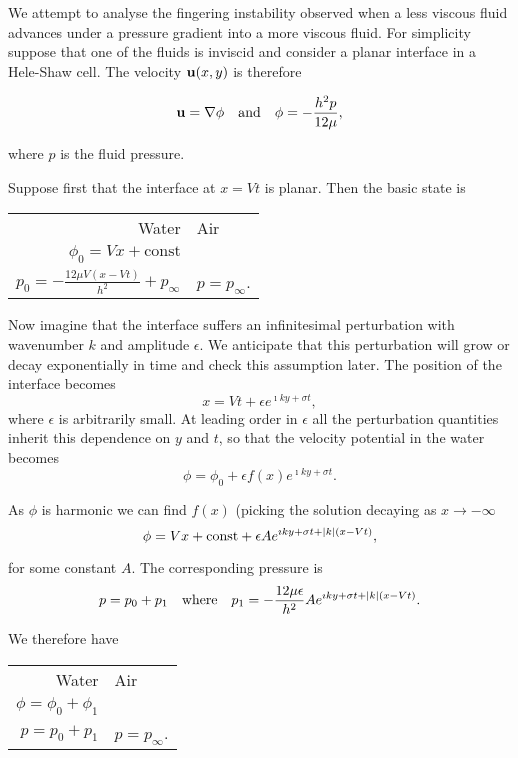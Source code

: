 \documentclass{notes}
\theoremstyle{plain}
\begin{document}
We attempt to analyse the fingering instability observed when a less viscous
fluid advances under a pressure gradient into a more viscous fluid.
For simplicity suppose that one of the fluids is inviscid and consider
a planar interface in a Hele-Shaw cell.  The velocity $\mathbf{u}(x,y)$ is therefore

\[
\mathbf{u} = \nabla \phi \quad \text{and} \quad \phi = - \frac{h^2 p}{12 \mu},
\]

where $p$ is the fluid pressure.

Suppose first that the interface at $x = V t$ is planar.  Then the basic
state is

\begin{center}
\begin{tabular}{r l}
Water & Air \\
$\phi_0 = V x + \text{const}$ &  \\
$p_0 = -\tfrac{12 \mu V (x - Vt)}{h^2} + p_\infty$ & $p = p_\infty$.
\end{tabular}
\end{center}

Now imagine that the interface suffers an infinitesimal perturbation
with wavenumber $k$ and amplitude $\epsilon$.  We anticipate that
this perturbation will grow or decay exponentially in time and check
this assumption later.  The position of the interface becomes
\[
x = V t + \epsilon e^{\imath k y + \sigma t},
\]
where $\epsilon$ is arbitrarily small.  At leading order in $\epsilon$
all the perturbation quantities inherit this dependence on $y$
and $t$, so that the velocity potential in the water becomes
\[
\phi = \phi_0 + \epsilon f(x) e^{\imath k y + \sigma t}.
\]

As $\phi$ is harmonic we can find $f(x)$ (picking the solution decaying
as $x \to - \infty$
\[
\phi = V x + \text{const} + \epsilon A e^{\imath k y + \sigma t
+ \left|k\right| \left( x - V t \right)},
\]

for some constant $A$.  The corresponding pressure is
\[
p = p_0 + p_1 \quad \text{where} \quad p_1 = - \frac{12 \mu \epsilon}{h^2}
A e^{\imath k y + \sigma t
+ \left|k\right| \left( x - V t \right)}.
\]

We therefore have

\begin{center}
\begin{tabular}{r l}
Water & Air \\
$\phi = \phi_0 + \phi_1$ &  \\
$p = p_0 + p_1$ & $p = p_\infty$.
\end{tabular}
\end{center}
\end{document}
